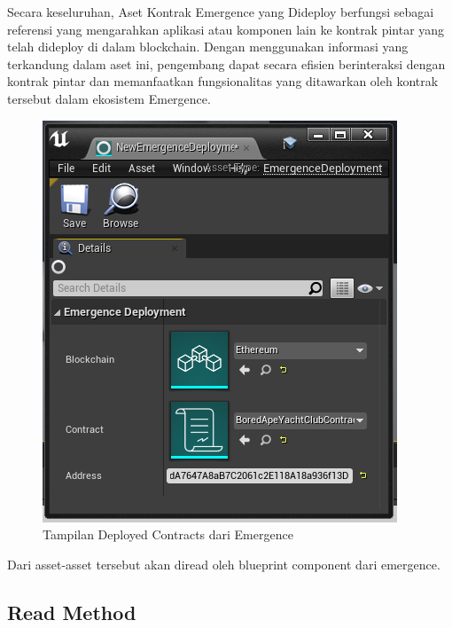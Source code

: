 Secara keseluruhan, Aset Kontrak Emergence yang Dideploy berfungsi sebagai referensi yang mengarahkan aplikasi atau komponen lain ke kontrak pintar yang telah dideploy di dalam blockchain. Dengan menggunakan informasi yang terkandung dalam aset ini, pengembang dapat secara efisien berinteraksi dengan kontrak pintar dan memanfaatkan fungsionalitas yang ditawarkan oleh kontrak tersebut dalam ekosistem Emergence.

\begin{figure}[H]
  \centering

  \includegraphics[scale=0.6]{gambar/emergencedeployedcontract.png}

  \caption{Tampilan Deployed Contracts dari Emergence}
  \label{fig:emergencedeployedcontract}
\end{figure}

Dari asset-asset tersebut akan diread oleh blueprint component dari emergence.

\subsection{Read Method}

